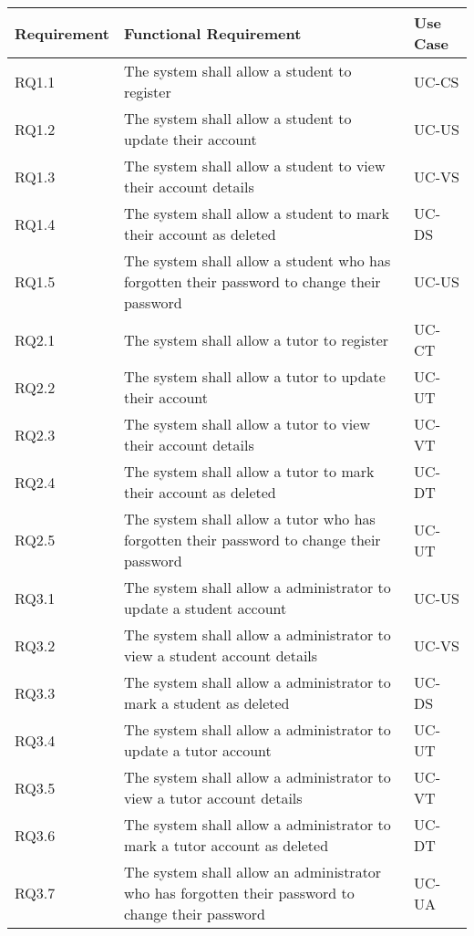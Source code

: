 \documentclass[12pt]{article}
\begin{document}
{
\centering
\begin{longtable}{| l | p{10cm}| l |}
			\hline			
			\textbf{Requirement} & \textbf{Functional Requirement} & \textbf{Use Case}
			
			\\ \hline RQ1.1 & The system shall allow a student to register  & UC-CS \\ \hline 
			RQ1.2 & The system shall allow a student to update their account & UC-US \\ \hline  
			RQ1.3 & The system shall allow a student to view their account details  & UC-VS \\ \hline 
			RQ1.4 & The system shall allow a student to mark their account as deleted & UC-DS  \\ \hline 
			RQ1.5 & The system shall allow a student who has forgotten their password to change their password & UC-US \\ \hline	
			
			
			RQ2.1 & The system shall allow a tutor to register & UC-CT \\ \hline
			RQ2.2 & The system shall allow a tutor to update their account  & UC-UT \\ \hline
			RQ2.3 & The system shall allow a tutor to view their account details & UC-VT \\ \hline
			RQ2.4 & The system shall allow a tutor to mark their account as deleted & UC-DT \\ \hline  
			RQ2.5 & The system shall allow a tutor who has forgotten their password to change their password & UC-UT \\ \hline	
						
			RQ3.1 & The system shall allow a administrator to update a student account & UC-US \\ \hline  
			RQ3.2 & The system shall allow a administrator to view a student account details  & UC-VS \\ \hline 
			RQ3.3 & The system shall allow a administrator to mark a student as deleted & UC-DS  \\ \hline 
			RQ3.4 & The system shall allow a administrator to update a tutor account  & UC-UT \\ \hline
			RQ3.5 & The system shall allow a administrator to view a tutor account details & UC-VT \\ \hline
			RQ3.6 & The system shall allow a administrator to mark a tutor account as deleted & UC-DT \\ \hline
			RQ3.7 & The system shall allow an administrator  who has forgotten their password to change their password & UC-UA \\ \hline	
			

\end{longtable}}
\end{document}
